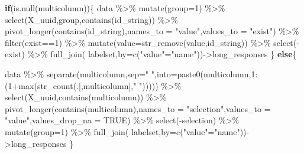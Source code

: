 \documentclass[
  letterpaper,
  DIV=11,
  numbers=noendperiod]{scrreprt}
\newenvironment{Shaded}{\begin{snugshade}}{\end{snugshade}}
\newcommand{\AttributeTok}[1]{\textcolor[rgb]{0.40,0.45,0.13}{#1}}
\newcommand{\ConstantTok}[1]{\textcolor[rgb]{0.56,0.35,0.01}{#1}}
\newcommand{\ControlFlowTok}[1]{\textcolor[rgb]{0.00,0.23,0.31}{\textbf{#1}}}
\newcommand{\DecValTok}[1]{\textcolor[rgb]{0.68,0.00,0.00}{#1}}
\newcommand{\FunctionTok}[1]{\textcolor[rgb]{0.28,0.35,0.67}{#1}}
\newcommand{\NormalTok}[1]{\textcolor[rgb]{0.00,0.23,0.31}{#1}}
\newcommand{\OtherTok}[1]{\textcolor[rgb]{0.00,0.23,0.31}{#1}}
\newcommand{\SpecialCharTok}[1]{\textcolor[rgb]{0.37,0.37,0.37}{#1}}
\newcommand{\StringTok}[1]{\textcolor[rgb]{0.13,0.47,0.30}{#1}}
\begin{document}
\begin{Shaded}
\begin{Highlighting}[]
  \ControlFlowTok{if}\NormalTok{(}\FunctionTok{is.null}\NormalTok{(multicolumn))\{}
\NormalTok{    data }\SpecialCharTok{\%\textgreater{}\%} 
      \FunctionTok{mutate}\NormalTok{(}\AttributeTok{group=}\DecValTok{1}\NormalTok{) }\SpecialCharTok{\%\textgreater{}\%}
      \FunctionTok{select}\NormalTok{(X\_uuid,group,}\FunctionTok{contains}\NormalTok{(id\_string)) }\SpecialCharTok{\%\textgreater{}\%}
      \FunctionTok{pivot\_longer}\NormalTok{(}\FunctionTok{contains}\NormalTok{(id\_string),}\AttributeTok{names\_to =} \StringTok{"value"}\NormalTok{,}\AttributeTok{values\_to =} \StringTok{"exist"}\NormalTok{) }\SpecialCharTok{\%\textgreater{}\%}
      \FunctionTok{filter}\NormalTok{(exist}\SpecialCharTok{==}\DecValTok{1}\NormalTok{) }\SpecialCharTok{\%\textgreater{}\%}
      \FunctionTok{mutate}\NormalTok{(}\AttributeTok{value=}\FunctionTok{str\_remove}\NormalTok{(value,id\_string)) }\SpecialCharTok{\%\textgreater{}\%}
      \FunctionTok{select}\NormalTok{(}\SpecialCharTok{{-}}\NormalTok{exist) }\SpecialCharTok{\%\textgreater{}\%}
      \FunctionTok{full\_join}\NormalTok{(}
\NormalTok{        labelset,}\AttributeTok{by=}\FunctionTok{c}\NormalTok{(}\StringTok{"value"}\OtherTok{=}\StringTok{"name"}\NormalTok{))}\OtherTok{{-}\textgreater{}}\NormalTok{long\_responses}
\NormalTok{  \}}
  \ControlFlowTok{else}\NormalTok{\{}
    
\NormalTok{    data }\SpecialCharTok{\%\textgreater{}\%} 
      \FunctionTok{separate}\NormalTok{(multicolumn,}\AttributeTok{sep=}\StringTok{" "}\NormalTok{,}\AttributeTok{into=}\FunctionTok{paste0}\NormalTok{(multicolumn,}\DecValTok{1}\SpecialCharTok{:}\NormalTok{(}\DecValTok{1}\SpecialCharTok{+}\FunctionTok{max}\NormalTok{(}\FunctionTok{str\_count}\NormalTok{(.[,multicolumn],}\StringTok{" "}\NormalTok{))))) }\SpecialCharTok{\%\textgreater{}\%}
      \FunctionTok{select}\NormalTok{(X\_uuid,}\FunctionTok{contains}\NormalTok{(multicolumn)) }\SpecialCharTok{\%\textgreater{}\%}
      \FunctionTok{pivot\_longer}\NormalTok{(}\FunctionTok{contains}\NormalTok{(multicolumn),}\AttributeTok{names\_to =} \StringTok{"selection"}\NormalTok{,}\AttributeTok{values\_to =} \StringTok{"value"}\NormalTok{,}\AttributeTok{values\_drop\_na =} \ConstantTok{TRUE}\NormalTok{) }\SpecialCharTok{\%\textgreater{}\%}
      \FunctionTok{select}\NormalTok{(}\SpecialCharTok{{-}}\NormalTok{selection) }\SpecialCharTok{\%\textgreater{}\%}
      \FunctionTok{mutate}\NormalTok{(}\AttributeTok{group=}\DecValTok{1}\NormalTok{) }\SpecialCharTok{\%\textgreater{}\%}
      \FunctionTok{full\_join}\NormalTok{(}
\NormalTok{        labelset,}\AttributeTok{by=}\FunctionTok{c}\NormalTok{(}\StringTok{"value"}\OtherTok{=}\StringTok{"name"}\NormalTok{))}\OtherTok{{-}\textgreater{}}\NormalTok{long\_responses}
\NormalTok{  \}}
  

\end{Highlighting}
\end{Shaded}
\end{document}
